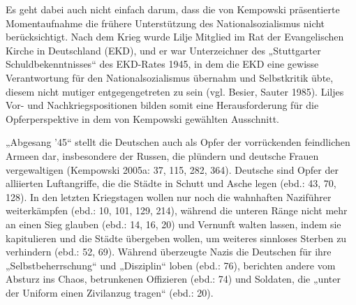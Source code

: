 \begin{multicols*}{2}
Es geht dabei auch nicht einfach darum, dass die von Kempowski präsentierte Momentaufnahme die frühere Unterstützung des Nationalsozialismus nicht berücksichtigt. Nach dem Krieg wurde Lilje Mitglied im Rat der Evangelischen Kirche in Deutschland (EKD), und er war Unterzeichner des „Stuttgarter Schuldbekenntnisses“ des EKD-Rates 1945, in dem die EKD eine gewisse Verantwortung für den Nationalsozialismus übernahm und Selbstkritik übte, diesem nicht mutiger entgegengetreten zu sein (vgl. Besier, Sauter 1985). Liljes Vor- und Nachkriegspositionen bilden somit eine Herausforderung für die Opferperspektive in dem von Kempowski gewählten Ausschnitt.

„Abgesang ’45“ stellt die Deutschen auch als Opfer der vorrückenden feindlichen Armeen dar, insbesondere der Russen, die plündern und deutsche Frauen vergewaltigen (Kempowski 2005a: 37, 115, 282, 364). Deutsche sind Opfer der alliierten Luftangriffe, die die Städte in Schutt und Asche legen (ebd.: 43, 70, 128). In den letzten Kriegstagen wollen nur noch die wahnhaften Naziführer weiterkämpfen (ebd.: 10, 101, 129, 214), während die unteren Ränge nicht mehr an einen Sieg glauben (ebd.: 14, 16, 20) und Vernunft walten lassen, indem sie kapitulieren und die Städte übergeben wollen, um weiteres sinnloses Sterben zu verhindern (ebd.: 52, 69). Während überzeugte Nazis die Deutschen für ihre „Selbstbeherrschung“ und „Disziplin“ loben (ebd.: 76), berichten andere vom Absturz ins Chaos, betrunkenen Offizieren (ebd.: 74) und Soldaten, die „unter der Uniform einen Zivilanzug tragen“ (ebd.: 20).


\end{multicols*}
